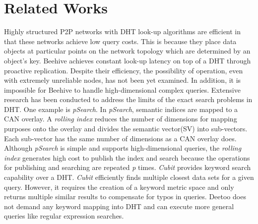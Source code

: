 \section{Related Works}
\label{sec:related_works}
Highly structured P2P networks with DHT look-up algorithms 
\cite{is:Chord, sr:CAN, bz:Tapestry, pr:Symphony} 
are efficient in that these networks achieve low query costs. This is 
because they place data objects at particular points on the network topology
which are determined by an object's key. Beehive\cite{re:beehive04} 
achieves constant look-up latency on top of a
DHT through proactive replication. Despite their efficiency, the possibility 
of operation, even with extremely unreliable nodes, has not been yet
examined. In addition, it is impossible for Beehive to handle
high-dimensional complex queries.  Extensive research has been conducted 
to address the limits of the exact search problems in DHT.
One example is \emph{pSearch}.\cite{psearch}
In \emph{pSearch}, semantic indices are mapped to a CAN overlay. 
A \emph{rolling index} reduces the number of dimensions for mapping purposes 
onto the overlay and divides the semantic vector(SV) into sub-vectors. 
Each sub-vector has the same number of dimensions as a CAN overlay does.
Although \emph{pSearch} is simple and supports high-dimensional queries, 
the \emph{rolling index} generates high cost to publish the index and search 
because the operations for publishing and searching are repeated \textit{p} times.
\emph{Cubit}\cite{cubit} provides keyword search capability over a DHT. \emph{Cubit} 
efficiently finds multiple closest data sets for a given query. However, 
it requires the creation of a keyword metric space and only returns multiple similar results
to compensate for typos in queries. Deetoo does not demand any keyword mapping 
into DHT and can execute more general queries like regular expression searches.

